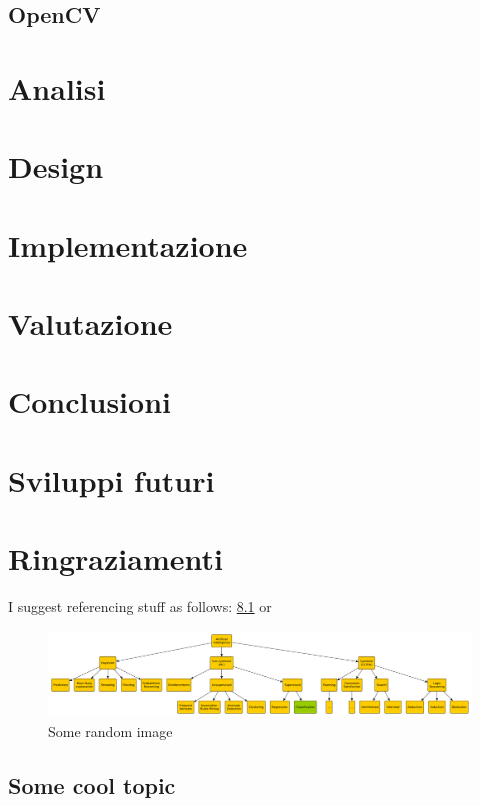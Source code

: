 \documentclass[12pt,a4paper,openright,twoside]{book}
\begin{document}
\cite{reverseEngineeringArucoMarkers}

\section{OpenCV}

\chapter{Analisi}

\chapter{Design}

\chapter{Implementazione}

\chapter{Valutazione}

\chapter{Conclusioni}

\chapter{Sviluppi futuri}

\chapter{Ringraziamenti}

I suggest referencing stuff as follows: \cref{fig:random-image} or 

\begin{figure}
    \centering
    \includegraphics[width=.8\linewidth]{figures/random-image.pdf}
    \caption{Some random image}
    \label{fig:random-image}
\end{figure}

\section{Some cool topic}
\end{document}
